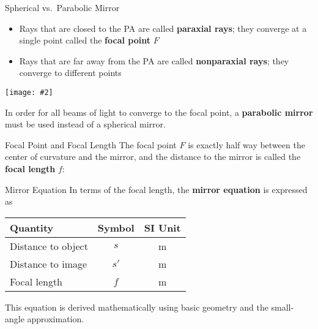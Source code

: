 \documentclass[12pt,compress,aspectratio=169]{beamer}
\newcommand{\pic}[2]{\texttt{[image: \#2]}}
\newcommand{\eq}[2]{\vspace{#1}{\LARGE\begin{displaymath}#2\end{displaymath}}}
\begin{document}
\begin{frame}{Spherical vs.\ Parabolic Mirror}
  \begin{itemize}
  \item Rays that are closed to the PA are called \textbf{paraxial rays}; they
    converge at a single point called the \textbf{focal point} $F$
  \item Rays that are far away from the PA are called \textbf{nonparaxial rays};
    they converge to different points
  \end{itemize}
  \begin{center}
    \pic{.6}{graphics/spherical-vs-parabolic}
  \end{center}
  In order for all beams of light to converge to the focal point, a
  \textbf{parabolic mirror} must be used instead of a spherical mirror.
\end{frame}



\begin{frame}{Focal Point and Focal Length}
  The focal point $F$ is exactly half way between the center of curvature and
  the mirror, and the distance to the mirror is called the \textbf{focal length}
  $f$:

  \eq{-.2in}{
    \boxed{f=\frac12 r}
  }
  \begin{center}
  \end{center}
  
\end{frame}


\begin{frame}{Mirror Equation}
  In terms of the focal length, the \textbf{mirror equation} is expressed as

  \eq{-.2in}{
    \boxed{\frac1s+\frac1{s'}=\frac1f}
  }
  \begin{center}
    \begin{tabular}{l|c|c}
      \rowcolor{pink}
      \textbf{Quantity} & \textbf{Symbol} & \textbf{SI Unit} \\ \hline
      Distance to object & $s$  & \si{\metre} \\
      Distance to image  & $s'$ & \si{\metre} \\
      Focal length       & $f$  & \si{\metre} 
    \end{tabular}
  \end{center}
  This equation is derived mathematically using basic geometry and the
  small-angle approximation.
\end{frame}
\end{document}
